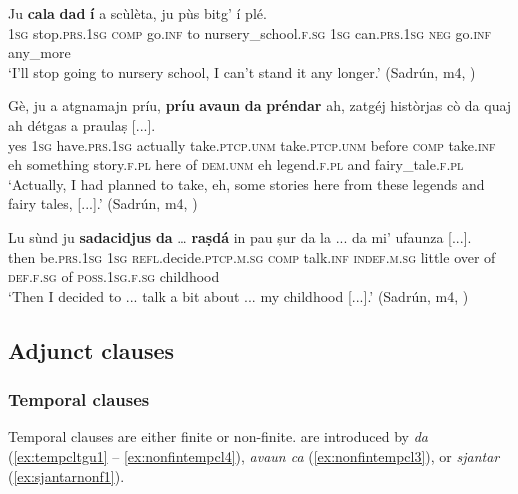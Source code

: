 \ea
\label{ex:preparg3}
\gll  Ju \textbf{cala} \textbf{dad} \textbf{í} a scùlèta, ju pùs bitg' í plé.\\
\textsc{1sg} stop.\textsc{prs.1sg} \textsc{comp} go.\textsc{inf} to nursery\_school.\textsc{f.sg} \textsc{1sg} can.\textsc{prs.1sg} \textsc{neg} go.\textsc{inf} any\_more  \\
\glt `I’ll stop going to nursery school, I can’t stand it any longer.' (Sadrún, m4, )
\z

\ea
\label{ex:preparg4}
\gll Gè, ju a atgnamajn príu, \textbf{príu} \textbf{avaun} \textbf{da} \textbf{préndar} ah, zatgéj històrjas cò da quaj ah détgas a praulaṣ [...].\\
yes \textsc{1sg} have.\textsc{prs.1sg} actually take.\textsc{ptcp.unm} take.\textsc{ptcp.unm} before \textsc{comp} take.\textsc{inf} eh something story.\textsc{f.pl} here of \textsc{dem.unm} eh legend.\textsc{f.pl} and fairy\_tale.\textsc{f.pl}\\
\glt `Actually, I had planned to take, eh, some stories here from these legends and fairy tales, [...].' (Sadrún, m4, )
\z

\largerpage
\ea
\label{ex:preparg5}
\gll Lu sùnd ju \textbf{sadacidjus} \textbf{da} … \textbf{raṣdá} in pau ṣur da la ... da mi’ ufaunza [...].\\
then be.\textsc{prs.1sg}  \textsc{1sg}  \textsc{refl}.decide.\textsc{ptcp.m.sg}  \textsc{comp} {} talk.\textsc{inf} \textsc{indef.m.sg} little over of  \textsc{def.f.sg} {} of  \textsc{poss.1sg.f.sg} childhood\\
\glt `Then I decided to ... talk a bit about ... my childhood [...].' (Sadrún, m4, )
\z

\subsection{Adjunct clauses}\label{sec:6.2.2}

\subsubsection{Temporal clauses}\label{sec:6.2.2.1}
Temporal clauses are either finite or non-finite.  are introduced by \textit{da} (\ref{ex:tempcltgu1} -- \ref{ex:nonfintempcl4}),  \textit{avaun ca} (\ref{ex:nonfintempcl3}), or \textit{sjantar} (\ref{ex:sjantarnonf1}).

